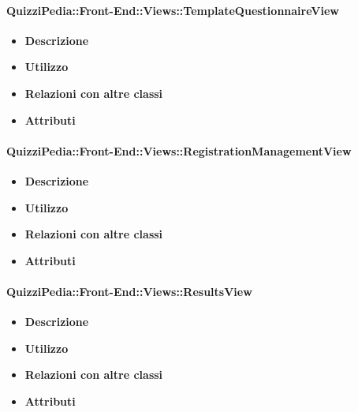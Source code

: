 \paragraph{QuizziPedia::Front-End::Views::TemplateQuestionnaireView}
\begin{itemize}
	\item \textbf{Descrizione}
	\item \textbf{Utilizzo}
	\item \textbf{Relazioni con altre classi}
	\item \textbf{Attributi}
\end{itemize}

\paragraph{QuizziPedia::Front-End::Views::RegistrationManagementView}
\begin{itemize}
	\item \textbf{Descrizione}
	\item \textbf{Utilizzo}
	\item \textbf{Relazioni con altre classi}
	\item \textbf{Attributi}
\end{itemize}

\paragraph{QuizziPedia::Front-End::Views::ResultsView}
\begin{itemize}
	\item \textbf{Descrizione}
	\item \textbf{Utilizzo}
	\item \textbf{Relazioni con altre classi}
	\item \textbf{Attributi}
\end{itemize}